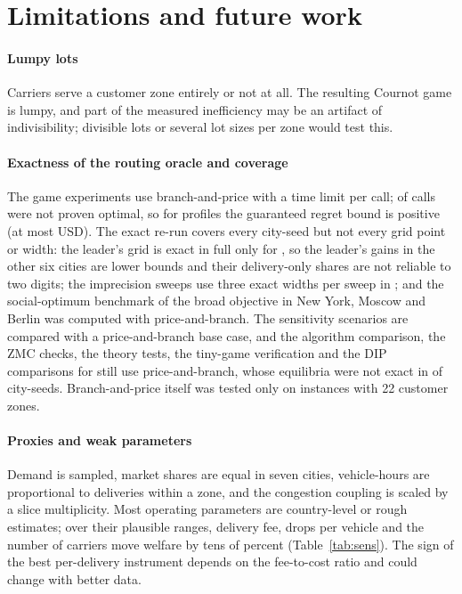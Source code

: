 \documentclass[preprint,12pt]{elsarticle}
\theoremstyle{definition}
\theoremstyle{remark}
\begin{document}
\section{Limitations and future work}\label{sec:limits}

\paragraph{Lumpy lots} Carriers serve a customer zone entirely or not at all. The resulting Cournot game is lumpy, and part of the measured inefficiency may be an artifact of indivisibility; divisible lots or several lot sizes per zone would test this.

\paragraph{Exactness of the routing oracle and coverage} The game experiments use branch-and-price with a time limit per call; \ExUnproven{} of \ExCalls{} calls were not proven optimal, so for \ExBoundN{} profiles the guaranteed regret bound is positive (at most \ExBoundMax{} USD). The exact re-run covers every city-seed but not every grid point or width: the leader's grid is exact in full only for \ExEtwoFullCities, so the leader's gains in the other six cities are lower bounds and their delivery-only shares are not reliable to two digits; the imprecision sweeps use three exact widths per sweep in \ExEfourRedCities; and the social-optimum benchmark of the broad objective in New York, Moscow and Berlin was computed with price-and-branch. The sensitivity scenarios are compared with a price-and-branch base case, and the algorithm comparison, the ZMC checks, the theory tests, the tiny-game verification and the DIP comparisons for \DipPbCases{} still use price-and-branch, whose equilibria were not exact in \ExOldBadN{} of \ExOldN{} city-seeds. Branch-and-price itself was tested only on instances with 22 customer zones.

\paragraph{Proxies and weak parameters} Demand is sampled, market shares are equal in seven cities, vehicle-hours are proportional to deliveries within a zone, and the congestion coupling is scaled by a slice multiplicity. Most operating parameters are country-level or rough estimates; over their plausible ranges, delivery fee, drops per vehicle and the number of carriers move welfare by tens of percent (Table~\ref{tab:sens}). The sign of the best per-delivery instrument depends on the fee-to-cost ratio and could change with better data.
\end{document}
